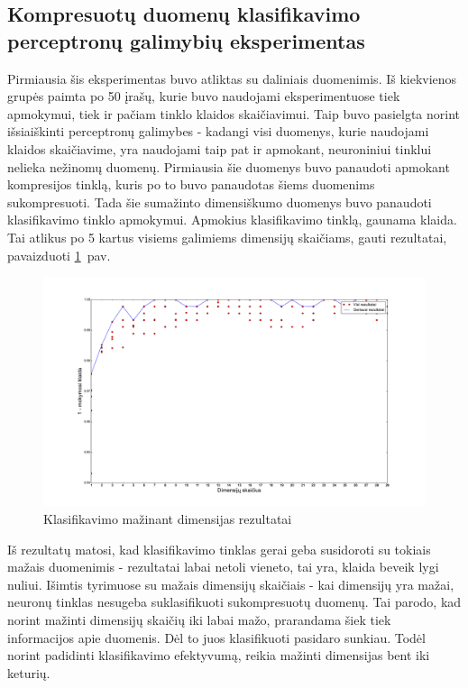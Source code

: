 \documentclass{VUMIFPSbakalaurinis}
\begin{document}
\subsection{Kompresuotų duomenų klasifikavimo perceptronų galimybių eksperimentas}

Pirmiausia šis eksperimentas buvo atliktas su daliniais duomenimis.
Iš kiekvienos grupės paimta po 50 įrašų, kurie buvo naudojami eksperimentuose tiek apmokymui, tiek ir pačiam tinklo klaidos skaičiavimui.
Taip buvo pasielgta norint išsiaiškinti perceptronų galimybes - kadangi visi duomenys, kurie naudojami klaidos skaičiavime, yra naudojami taip pat ir apmokant, neuroniniui tinklui nelieka nežinomų duomenų.
Pirmiausia šie duomenys buvo panaudoti apmokant kompresijos tinklą, kuris po to buvo panaudotas šiems duomenims sukompresuoti.
Tada šie sumažinto dimensiškumo duomenys buvo panaudoti klasifikavimo tinklo apmokymui.
Apmokius klasifikavimo tinklą, gaunama klaida.
Tai atlikus po 5 kartus visiems galimiems dimensijų skaičiams, gauti rezultatai, pavaizduoti \ref{fig:experiment-1}~pav.

\begin{figure}
	\includegraphics[scale=0.32]{pics/dimensions_2015-5-23_15-50-6}
	\caption{Klasifikavimo mažinant dimensijas rezultatai}
	\label{fig:experiment-1}
\end{figure}

Iš rezultatų matosi, kad klasifikavimo tinklas gerai geba susidoroti su tokiais mažais duomenimis - rezultatai labai netoli vieneto, tai yra, klaida beveik lygi nuliui.
Išimtis tyrimuose su mažais dimensijų skaičiais - kai dimensijų yra mažai, neuronų tinklas nesugeba suklasifikuoti sukompresuotų duomenų.
Tai parodo, kad norint mažinti dimensijų skaičių iki labai mažo, prarandama šiek tiek informacijos apie duomenis.
Dėl to juos klasifikuoti pasidaro sunkiau.
Todėl norint padidinti klasifikavimo efektyvumą, reikia mažinti dimensijas bent iki keturių.
\end{document}
